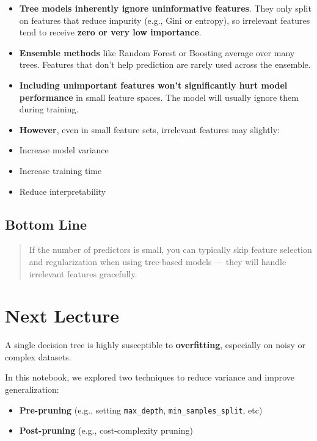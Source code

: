 \documentclass[
  letterpaper,
  DIV=11,
  numbers=noendperiod]{scrreprt}
\providecommand{\tightlist}{%
  \setlength{\itemsep}{0pt}\setlength{\parskip}{0pt}}\usepackage{longtable,booktabs,array}
\begin{document}
\begin{itemize}
\tightlist
\item
  \textbf{Tree models inherently ignore uninformative features}. They
  only split on features that reduce impurity (e.g., Gini or entropy),
  so irrelevant features tend to receive \textbf{zero or very low
  importance}.
\item
  \textbf{Ensemble methods} like Random Forest or Boosting average over
  many trees. Features that don't help prediction are rarely used across
  the ensemble.
\item
  \textbf{Including unimportant features won't significantly hurt model
  performance} in small feature spaces. The model will usually ignore
  them during training.
\item
  \textbf{However}, even in small feature sets, irrelevant features may
  slightly:
\item
  Increase model variance
\item
  Increase training time
\item
  Reduce interpretability
\end{itemize}

\subsection{Bottom Line}\label{bottom-line}

\begin{quote}
If the number of predictors is small, you can typically skip feature
selection and regularization when using tree-based models --- they will
handle irrelevant features gracefully.
\end{quote}

\section{Next Lecture}\label{next-lecture}

A single decision tree is highly susceptible to \textbf{overfitting},
especially on noisy or complex datasets.

In this notebook, we explored two techniques to reduce variance and
improve generalization:

\begin{itemize}
\tightlist
\item
  \textbf{Pre-pruning} (e.g., setting \texttt{max\_depth},
  \texttt{min\_samples\_split}, etc)
\item
  \textbf{Post-pruning} (e.g., cost-complexity pruning)
\end{itemize}
\end{document}
